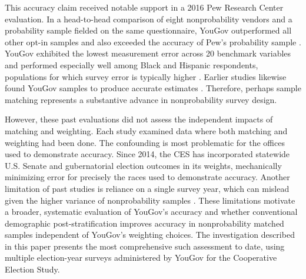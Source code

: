 \documentclass[12pt]{article}
\begin{document}
This accuracy claim received notable support in a 2016 Pew Research Center evaluation. In a head-to-head comparison of eight nonprobability vendors and a probability sample fielded on the same questionnaire, YouGov outperformed all other opt-in samples and also exceeded the accuracy of Pew’s probability sample \parencite{kennedy_evaluating_2016}. YouGov exhibited the lowest measurement error across 20 benchmark variables and performed especially well among Black and Hispanic respondents, populations for which survey error is typically higher \parencite{hopkins_getting_2024}. Earlier studies likewise found YouGov samples to produce accurate estimates \parencite{ansolabehere_cooperative_2013, ansolabehere_does_2014, rivers_inference_2009, vavreck_2006_2008}. Therefore, perhaps sample matching represents a substantive advance in nonprobability survey design.

However, these past evaluations did not assess the independent impacts of matching and weighting. Each study examined data where both matching and weighting had been done. The confounding is most problematic for the offices used to demonstrate accuracy. Since 2014, the CES has incorporated statewide U.S. Senate and gubernatorial election outcomes in its weights, mechanically minimizing error for precisely the races used to demonstrate accuracy. Another limitation of past studies is reliance on a single survey year, which can mislead given the higher variance of nonprobability samples \parencite{macinnis_accuracy_2018}. These limitations motivate a broader, systematic evaluation of YouGov's accuracy and whether conventional demographic post-stratification improves accuracy in nonprobability matched samples independent of YouGov's weighting choices. The investigation described in this paper presents the most comprehensive such assessment to date, using multiple election-year surveys administered by YouGov for the Cooperative Election Study.


\end{document}
